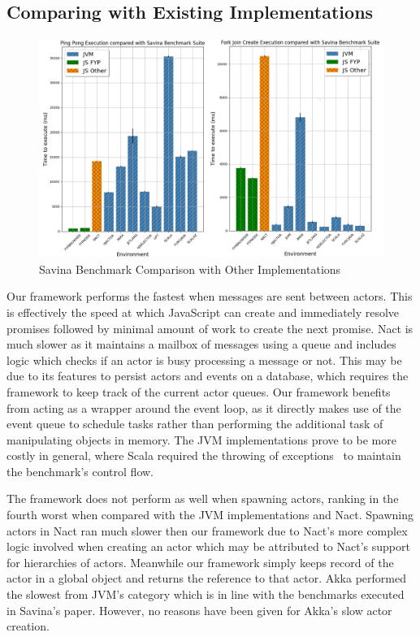 \documentclass[12pt, a4paper]{report}
\theoremstyle{definition}
\theoremstyle{definition}%
\theoremstyle{definition}%
\theoremstyle{definition}%
\theoremstyle{definition}%
\theoremstyle{definition}%
\begin{document}
\subsection{Comparing with Existing Implementations}
\begin{figure}[H]
    \begin{centering}
        \includegraphics[width=\textwidth]{resources/savina.png}
        \caption{Savina Benchmark Comparison with Other Implementations}
    \end{centering}
\end{figure}
Our framework performs the fastest when messages are sent between actors. This is effectively the speed at which JavaScript can create and immediately resolve promises followed by minimal amount of work to create the next promise. Nact is much slower as it maintains a mailbox of messages using a queue and includes logic which checks if an actor is busy processing a message or not. This may be due to its features to persist actors and events on a database, which requires the framework to keep track of the current actor queues. Our framework benefits from acting as a wrapper around the event loop, as it directly makes use of the event queue to schedule tasks rather than performing the additional task of manipulating objects in memory. The JVM implementations prove to be more costly in general, where Scala required the throwing of exceptions~\cite{savina} to maintain the benchmark's control flow.

The framework does not perform as well when spawning actors, ranking in the fourth worst when compared with the JVM implementations and Nact.  Spawning actors in Nact ran much slower then our framework due to Nact's more complex logic involved when creating an actor which may be attributed to Nact's support for hierarchies of actors. Meanwhile our framework simply keeps record of the actor in a global object and returns the reference to that actor. Akka performed the slowest from JVM's category which is in line with the benchmarks executed in Savina's paper.  However, no reasons have been given for Akka's slow actor creation.
\end{document}
